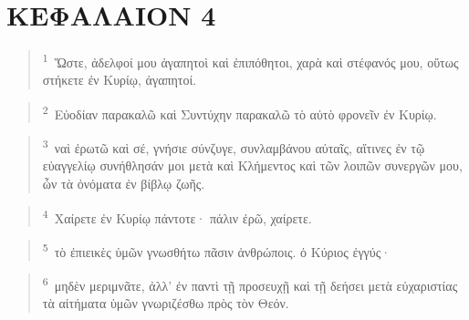 \documentclass{article}
\newcommand{\currentverse}{1} %
\newcommand{\setcurrentverse}[1]{\renewcommand{\currentverse}{#1}}
\begin{document}
\section*{ΚΕΦΑΛΑΙΟΝ 4}

\begin{verse}

\setcurrentverse{1}

\setcounter{footnote}{0}

\textsuperscript{1}~Ὥστε, ἀδελφοί μου ἀγαπητοὶ καὶ ἐπιπόθητοι, χαρὰ καὶ στέφανός μου, οὕτως στήκετε ἐν Κυρίῳ, ἀγαπητοί.

\end{verse}

\begin{verse}

\setcurrentverse{2}

\setcounter{footnote}{0}

\textsuperscript{2}~Εὐοδίαν παρακαλῶ καὶ Συντύχην παρακαλῶ τὸ αὐτὸ φρονεῖν ἐν Κυρίῳ.

\end{verse}

\begin{verse}

\setcurrentverse{3}

\setcounter{footnote}{0}

\textsuperscript{3}~ναὶ ἐρωτῶ καὶ σέ, γνήσιε σύνζυγε, συνλαμβάνου αὐταῖς, αἵτινες ἐν τῷ εὐαγγελίῳ συνήθλησάν μοι μετὰ καὶ Κλήμεντος καὶ τῶν λοιπῶν συνεργῶν μου, ὧν τὰ ὀνόματα ἐν βίβλῳ ζωῆς.

\end{verse}

\begin{verse}

\setcurrentverse{4}

\setcounter{footnote}{0}

\textsuperscript{4}~Χαίρετε ἐν Κυρίῳ πάντοτε· πάλιν ἐρῶ, χαίρετε.

\end{verse}

\begin{verse}

\setcurrentverse{5}

\setcounter{footnote}{0}

\textsuperscript{5}~τὸ ἐπιεικὲς ὑμῶν γνωσθήτω πᾶσιν ἀνθρώποις. ὁ Κύριος ἐγγύς·

\end{verse}

\begin{verse}

\setcurrentverse{6}

\setcounter{footnote}{0}

\textsuperscript{6}~μηδὲν μεριμνᾶτε, ἀλλ’ ἐν παντὶ τῇ προσευχῇ καὶ τῇ δεήσει μετὰ εὐχαριστίας τὰ αἰτήματα ὑμῶν γνωριζέσθω πρὸς τὸν Θεόν.

\end{verse}
\end{document}
